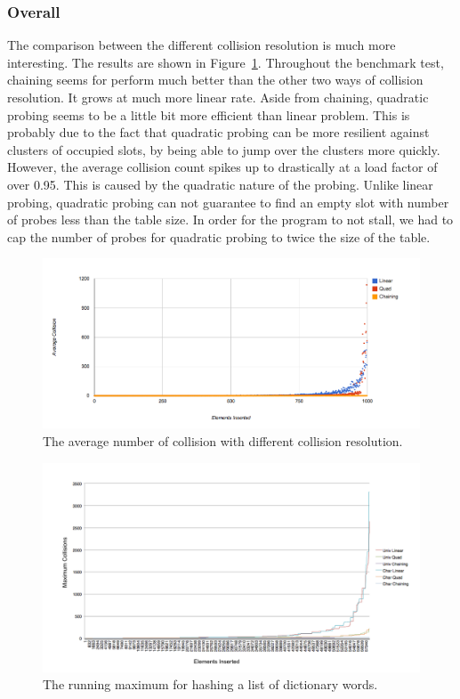 \documentclass[11pt]{article}
\begin{document}
\subsubsection{Overall}
The comparison between the different collision resolution is much more interesting.
The results are shown in Figure~\ref{fig:collision}.
Throughout the benchmark test, chaining seems for perform much better than the other
two ways of collision resolution. It grows at much more linear rate. 
Aside from chaining, quadratic probing seems to be a little bit more 
efficient than linear problem. This is probably due to the fact that quadratic probing 
can be more resilient against clusters of occupied slots, by being able to jump over
the clusters more quickly. However, the average collision count spikes up to drastically
at a load factor of over 0.95. This is caused by the quadratic nature of the probing. Unlike linear
probing, quadratic probing can not guarantee to find an empty slot with number of probes
less than the table size. In order for the program to not stall, we had to cap the number of probes for quadratic probing to twice the size of the table.

\begin{figure}
        
                \centering
                \includegraphics[width=\textwidth]{collision-all.png}
              \caption{The average number of collision with different collision resolution.}
              \label{fig:collision}
\end{figure}


\begin{figure}
                \centering
                \includegraphics[width= 1.2\textwidth]{string-max-query.png}
              \caption{The running maximum for hashing a list of dictionary words.}
              \label{fig:string-time}
\end{figure}
\end{document}
